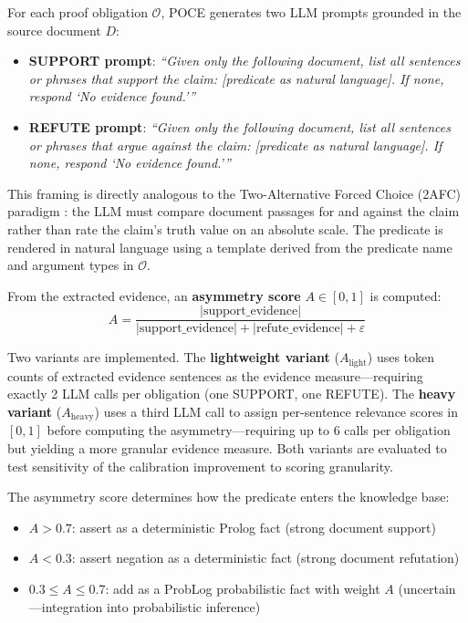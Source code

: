 \documentclass[11pt,letterpaper]{article}
\begin{document}
For each proof obligation $\mathcal{O}$, POCE generates two LLM prompts grounded in the source document $D$:

\begin{itemize}
  \item \textbf{SUPPORT prompt}: \emph{``Given only the following document, list all sentences or phrases that support the claim: [predicate as natural language]. If none, respond `No evidence found.'\thinspace''}
  \item \textbf{REFUTE prompt}: \emph{``Given only the following document, list all sentences or phrases that argue against the claim: [predicate as natural language]. If none, respond `No evidence found.'\thinspace''}
\end{itemize}

This framing is directly analogous to the Two-Alternative Forced Choice (2AFC) paradigm \citep{Green1966}: the LLM must compare document
passages for and against the claim rather than rate the claim's truth value on an absolute scale. The predicate is rendered
in natural language using a template derived from the predicate name and argument types in $\mathcal{O}$.

From the extracted evidence, an \textbf{asymmetry score} $A \in [0,1]$ is computed:
\[
A = \frac{|\text{support\_evidence}|}{|\text{support\_evidence}| + |\text{refute\_evidence}| + \varepsilon}
\]

Two variants are implemented. The \textbf{lightweight variant} ($A_\text{light}$) uses token counts of extracted evidence sentences as the evidence measure---requiring exactly
2 LLM calls per obligation (one SUPPORT, one REFUTE). The \textbf{heavy variant} ($A_\text{heavy}$) uses a third LLM call
to assign per-sentence relevance scores in $[0,1]$ before computing the asymmetry---requiring up to 6 calls per obligation
but yielding a more granular evidence measure. Both variants are evaluated to test sensitivity of the calibration improvement
to scoring granularity.

The asymmetry score determines how the predicate enters the knowledge base:
\begin{itemize}
  \item $A > 0.7$: assert as a deterministic Prolog fact (strong document support)
  \item $A < 0.3$: assert negation as a deterministic fact (strong document refutation)
  \item $0.3 \leq A \leq 0.7$: add as a ProbLog probabilistic fact with weight $A$ (uncertain---integration into probabilistic inference)
\end{itemize}
\end{document}
